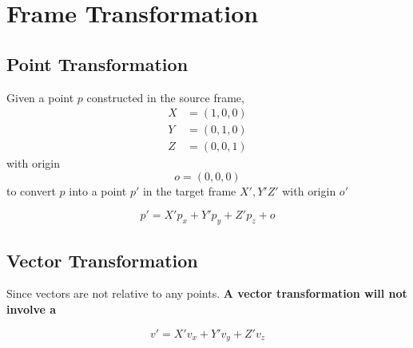 \section{Frame Transformation}

\subsection{Point Transformation}

  Given a point $ p $ constructed in the source frame,
  \begin{align*}
    X &= \left( 1, 0, 0 \right) \\
    Y &= \left( 0, 1, 0 \right) \\
    Z &= \left( 0, 0, 1 \right)
  \end{align*}
  with origin
  \begin{equation*}
    o = \left( 0, 0, 0 \right)
  \end{equation*}
  to convert $ p $ into a point $ p' $ in the target frame $ X', Y' Z' $
  with origin $ o' $

  \begin{equation}
    p' = X' p_{x} + Y' p_{y} + Z' p_{z} + o
  \end{equation}

\subsection{Vector Transformation}

  Since vectors are not relative to any points. \textbf{A vector
  transformation will not involve a }

  \begin{equation}
    v' = X' v_{x} + Y' v_{y} + Z' v_{z}
  \end{equation}
